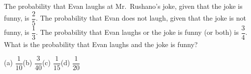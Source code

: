 The probability that Evan laughs at Mr.\ Rushano's joke, given that the joke is funny, is $\dfrac{2}{5}$. The probability that Evan does not laugh, given that the joke is not funny, is $\dfrac{1}{3}$. The probability that Evan laughs or the joke is funny (or both) is $\dfrac{3}{4}$. What is the probability that Evan laughs and the joke is funny?

(a) $\dfrac{1}{10}$\quad (b) $\dfrac{3}{40}$\quad (c) $\dfrac{1}{15}$\quad (d) $\dfrac{1}{20}$

